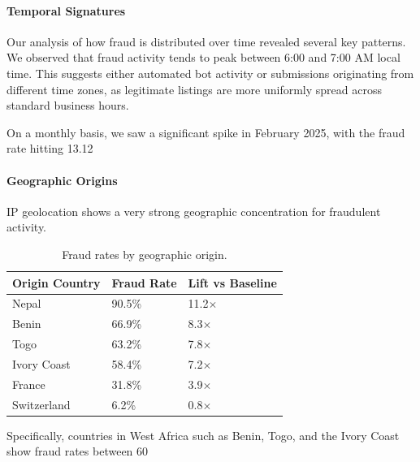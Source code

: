 \paragraph{Temporal Signatures}
Our analysis of how fraud is distributed over time revealed several key patterns. We observed that fraud activity tends to peak between 6:00 and 7:00 AM local time. This suggests either automated bot activity or submissions originating from different time zones, as legitimate listings are more uniformly spread across standard business hours.

On a monthly basis, we saw a significant spike in February 2025, with the fraud rate hitting 13.12%

\paragraph{Geographic Origins}
IP geolocation shows a very strong geographic concentration for fraudulent activity.

\begin{table}[h]
\centering
\caption{Fraud rates by geographic origin.}
\begin{tabular}{lll}
\hline
Origin Country & Fraud Rate & Lift vs Baseline \\
\hline
Nepal & 90.5\% & 11.2$\times$ \\
Benin & 66.9\% & 8.3$\times$ \\
Togo & 63.2\% & 7.8$\times$ \\
Ivory Coast & 58.4\% & 7.2$\times$ \\
France & 31.8\% & 3.9$\times$ \\
Switzerland & 6.2\% & 0.8$\times$ \\
\hline
\end{tabular}
\end{table}

Specifically, countries in West Africa such as Benin, Togo, and the Ivory Coast show fraud rates between 60%

